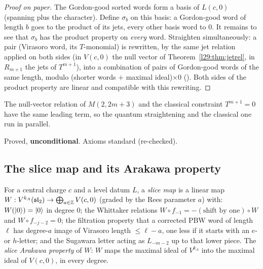 \begin{proof}[Proof on paper]
The Gordon-good sorted words form a basis of $L(c,0)$ (spanning plus the character). Define $\sigma_b$ on this basis:
a Gordon-good word of length $b$ goes to the product of its jets, every other basis word to $0$. It remains to see
that $\sigma_b$ has the product property on \emph{every} word. Straighten simultaneously: a pair (Virasoro word, its
$T$-monomial) is rewritten, by the same jet relation applied on both sides (in $V(c,0)$ the null vector of
Theorem~\ref{l29:thm:jetrel}, in $R_{m+1}$ the jets of $T^{m+1}$), into a combination of pairs of Gordon-good words of
the same length, modulo (shorter words $+$ maximal ideal)$\times0$ (). Both sides of the product
property are linear and compatible with this rewriting.
\end{proof}

\begin{physics}
The null-vector relation of $M(2,2m+3)$ and the classical constraint $T^{m+1}=0$ have the same leading term, so the
quantum straightening and the classical one run in parallel.
\end{physics}

\begin{status}
Proved, \textbf{unconditional}. Axioms standard (re-checked).
\end{status}

\subsection{The slice map and its Arakawa property}

\begin{definition}\label{l29:def:dsslice}
For a central charge $c$ and a level datum $L$, a \emph{slice map} is a linear map $W:V^{k_A}(\mathfrak{sl}_2)\to
\bigoplus_{a\in{\mathbb{Z}}}V(c,0)$ (graded by the Rees parameter $a$) with: $W(|0\rangle)=|0\rangle$ in degree $0$;
the Whittaker relations $W\circ f_{-1}=-(\text{shift by one})\circ W$ and $W\circ f_{-j-2}=0$; the filtration property
that a corrected PBW word of length $\ell$ has degree-$a$ image of Virasoro length $\le\ell-a$, one less if it starts with
an $e$- or $h$-letter; and the Sugawara letter acting as $L_{-m-2}$ up to that lower piece. The \emph{slice Arakawa
property} of $W$: $W$ maps the maximal ideal of $V^{k_A}$ into the maximal ideal of $V(c,0)$, in every degree.
\end{definition}

